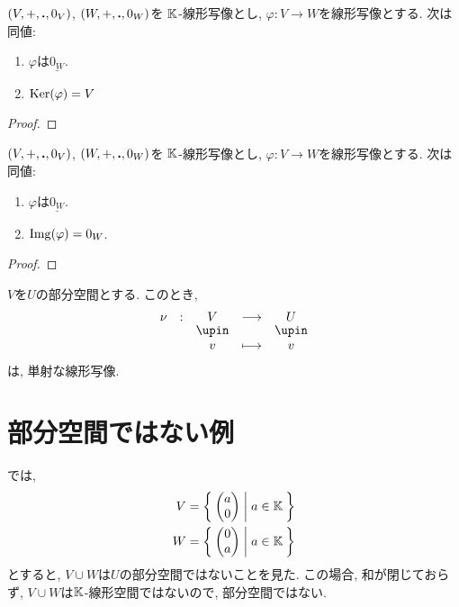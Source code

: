 \begin{prop}
  $(V,+,\mathbin{\boldsymbol{.}},0_V)$,
  $(W,+,\mathbin{\boldsymbol{.}},0_W)$を
  $\mathbb{K}$-線形写像とし,
  $\varphi\colon V\to W$を線形写像とする.
  次は同値:
  \begin{enumerate}
  \item $\varphi$は$\underline{0_W}$.
  \item $\operatorname{Ker}(\varphi)=V$
  \end{enumerate}
\end{prop}
\begin{proof}\end{proof}

\begin{prop}
  $(V,+,\mathbin{\boldsymbol{.}},0_V)$,
  $(W,+,\mathbin{\boldsymbol{.}},0_W)$を
  $\mathbb{K}$-線形写像とし,
  $\varphi\colon V\to W$を線形写像とする.
  次は同値:
  \begin{enumerate}
  \item $\varphi$は$\underline{0_W}$.
  \item $\operatorname{Img}(\varphi)=0_W$.
  \end{enumerate}
\end{prop}
\begin{proof}\end{proof}

\begin{prop}
  $V$を$U$の部分空間とする.
  このとき,
  \begin{align*}
    \shazo{\nu}{V}{U}
    {v}{v}
  \end{align*}
  は, 単射な線形写像.
\end{prop}


\section{部分空間ではない例}

\begin{example}
  では,
  \begin{align*}
    V&=\Set{\begin{pmatrix}a\\0\end{pmatrix}|a\in\mathbb{K}}\\
    W&=\Set{\begin{pmatrix}0\\a\end{pmatrix}|a\in\mathbb{K}}
  \end{align*}
  とすると, $V\cup W$は$U$の部分空間ではないことを見た.
  この場合, 和が閉じておらず, $V\cup W$は$\mathbb{K}$-線形空間ではないので,
  部分空間ではない.
\end{example}

